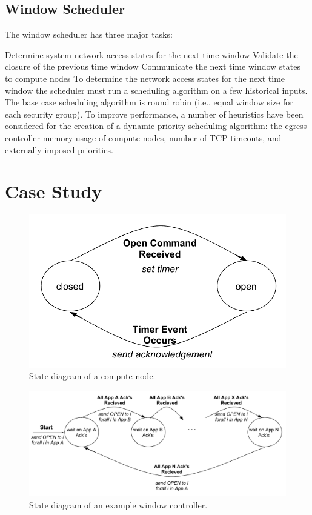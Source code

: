 \documentclass{llncs}
\begin{document}
\subsection{Window Scheduler}
The window scheduler has three major tasks: 

Determine system network access states for the next time window 
Validate the closure of the previous time window
Communicate the next time window states to compute nodes
To determine the network access states for the next time window the scheduler must run a scheduling algorithm on a few historical inputs. The base case scheduling algorithm is round robin (i.e., equal window size for each security group). To improve performance, a number of heuristics have been considered for the creation of a dynamic priority scheduling algorithm: the egress controller memory usage of compute nodes, number of TCP timeouts, and externally imposed priorities. 
\section{Case Study}
\begin{figure}
\centering
\includegraphics[scale=0.5]{node_state_diagram.pdf}
\caption{State diagram of a compute node.}
\label{fig:node_state_diagram}
\end{figure}
\begin{figure}
\centering
\includegraphics[scale=0.5]{control_state_diagram.pdf}
\caption{State diagram of an example window controller.}
\label{fig:control_state_diagram}
\end{figure}
\end{document}
